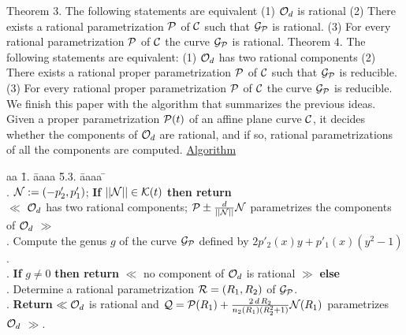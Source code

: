 \newline
{\sc Theorem 3.} The following statements are equivalent
\vspace{1 mm}
\newline
\hspace*{8 mm}
(1)  ${\cal O}_{d}$ is rational 
\vspace{1 mm}
\newline
\hspace*{8 mm}
(2) There exists a rational parametrization  ${\cal P}$ of ${\cal C}$
such that ${\cal G}_{\cal P}$ is rational.
\vspace{1 mm}
\newline
\hspace*{8 mm}
(3) For every rational parametrization ${\cal P}$ of ${\cal C}$ the curve 
${\cal G}_{\cal P}$ is rational.
\vspace{2 mm}
\newline
{\sc Theorem 4.} The following statements are equivalent:
\newline
\hspace*{8 mm}
(1)  ${\cal O}_{d}$ has two rational components
\vspace{1 mm}
\newline
\hspace*{8 mm}
(2) There exists a rational proper parametrization  ${\cal P}$ of 
${\cal C}$ such that ${\cal G}_{\cal P}$ is reducible.
\vspace{1 mm}
\newline
\hspace*{8 mm}
(3) For every rational proper parametrization ${\cal P}$ of ${\cal C}$ 
the curve ${\cal G}_{\cal P}$ is reducible.
\vspace{2 mm}
\newline
We finish this paper  with the algorithm  that summarizes the previous 
ideas. Given a proper  parametrization ${\cal P}(t)$ of an affine plane 
curve ${\cal C}$, it decides whether the components of ${\cal O}_{d}$  
are rational, and if so,  rational  parametrizations of all the components 
are computed.
\newline
\underline{Algorithm} 
\footnotesize
\begin{tabbing}
aa \= 1. \=  aaaa \= 5.3. \= aaaa \= \kill
\\
. \> ${\cal N}:=(-p'_{2},p'_{1})$; {\bf If} $|| {\cal N} || \in 
{\cal K}(t)$ {\bf then return} \\
\> \> \>  $\ll$ ${\cal O}_{d}$ has two rational components; 
${\cal P}\pm \frac{d}{|| {\cal N} ||} {\cal N}$ parametrizes the 
components of ${\cal O}_{d}$ $ \gg$   \\
. \> Compute the genus  $g$ of the curve ${\cal G}_{\cal P}$
defined by  $2p'_{2}(x)y+p'_{1}(x)(y^2-1)$. \\
. \>   {\bf If} $g\neq 0$ {\bf then return} $\ll$ no component of 
${\cal O}_{d}$ is rational $\gg$  {\bf else} \\
\> \> . \> Determine a rational parametrization 
${\cal R}=(R_{1},R_{2})$ of  ${\cal G}_{\cal P}$. \\
\> \> . \> {\bf Return} $\ll {\cal O}_{d}$ is rational and  
${\cal Q}={\cal P}(R_{1})+ \frac{2\,d\,R_{2}}{n_{2}(R_{1})(R^2_{2}
+1)}{\cal N}(R_{1})$ parametrizes ${\cal O}_{d}$ $\gg$.
\end{tabbing}
